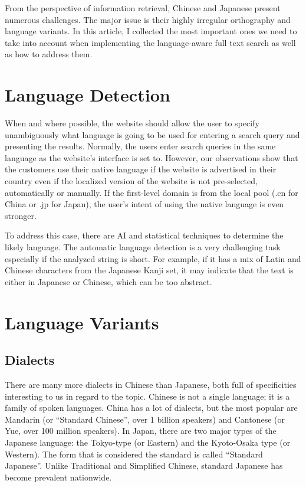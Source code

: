 \documentclass[11pt]{article}
\begin{document}
From the perspective of information retrieval, Chinese and Japanese present numerous challenges. The major issue is their highly irregular orthography and language variants. In this article, I collected the most important ones we need to take into account when implementing the language-aware full text search as well as how to address them.

\section{Language Detection}
When and where possible, the website should allow the user to specify unambiguously what language is going to be used for entering a search query and presenting the results. Normally, the users enter search queries in the same language as the website’s interface is set to. However, our observations show that the customers use their native language if the website is advertised in their country even if the localized version of the website is not pre-selected, automatically or manually. If the first-level domain is from the local pool (.cn for China or .jp for Japan), the user’s intent of using the native language is even stronger.

To address this case, there are AI and statistical techniques to determine the likely language. The automatic language detection is a very challenging task especially if the analyzed string is short. For example, if it has a mix of Latin and Chinese characters from the Japanese Kanji set, it may indicate that the text is either in Japanese or Chinese, which can be too abstract.

\section{Language Variants}
\subsection{Dialects}
There are many more dialects in Chinese than Japanese, both full of specificities interesting to us in regard to the topic. Chinese is not a single language; it is a family of spoken languages. China has a lot of dialects, but the most popular are Mandarin (or “Standard Chinese”, over 1 billion speakers) and Cantonese (or Yue, over 100 million speakers). In Japan, there are two major types of the Japanese language: the Tokyo-type (or Eastern) and the Kyoto-Osaka type (or Western). The form that is considered the standard is called “Standard Japanese”. Unlike Traditional and Simplified Chinese, standard Japanese has become prevalent nationwide.
\end{document}
